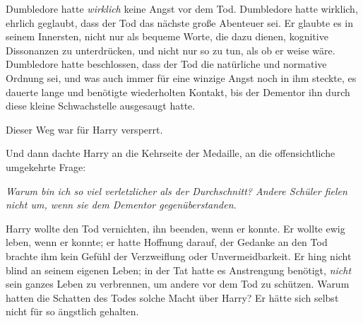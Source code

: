 Dumbledore hatte \emph{wirklich} keine Angst vor dem Tod. Dumbledore hatte wirklich, ehrlich geglaubt, dass der Tod das nächste große Abenteuer sei. Er glaubte es in seinem Innersten, nicht nur als bequeme Worte, die dazu dienen, kognitive Dissonanzen zu unterdrücken, und nicht nur so zu tun, als ob er weise wäre. Dumbledore hatte beschlossen, dass der Tod die natürliche und normative Ordnung sei, und was auch immer für eine winzige Angst noch in ihm steckte, es dauerte lange und benötigte wiederholten Kontakt, bis der Dementor ihn durch diese kleine Schwachstelle ausgesaugt hatte.

Dieser Weg war für Harry versperrt.

Und dann dachte Harry an die Kehrseite der Medaille, an die offensichtliche umgekehrte Frage:

\emph{Warum bin ich so viel verletzlicher als der Durchschnitt? Andere Schüler fielen nicht um, wenn sie dem Dementor gegenüberstanden.}

Harry wollte den Tod vernichten, ihn beenden, wenn er konnte. Er wollte ewig leben, wenn er konnte; er hatte Hoffnung darauf, der Gedanke an den Tod brachte ihm kein Gefühl der Verzweiflung oder Unvermeidbarkeit. Er hing nicht blind an seinem eigenen Leben; in der Tat hatte es Anstrengung benötigt, \emph{nicht} sein ganzes Leben zu verbrennen, um andere vor dem Tod zu schützen. Warum hatten die Schatten des Todes solche Macht über Harry? Er hätte sich selbst nicht für so ängstlich gehalten.

